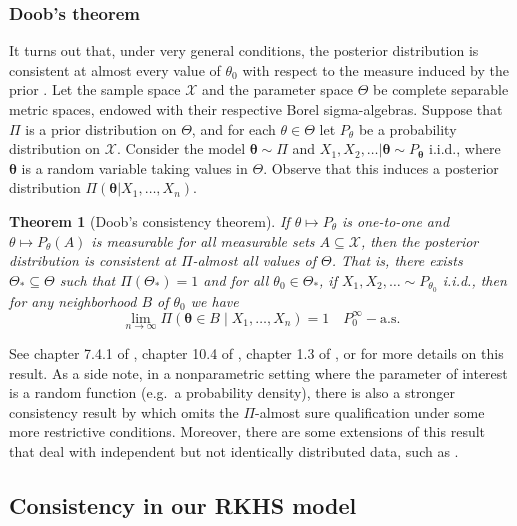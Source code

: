 \documentclass{article}
\numberwithin{equation}{section}
\theoremstyle{plain}
\newtheorem{theorem}{Theorem}[section]
\begin{document}
\subsubsection*{Doob's theorem}

It turns out that, under very general conditions, the posterior distribution is consistent at almost every value of \(\theta_0\) with respect to the measure induced by the prior \citep{doob1949application}. Let the sample space \(\mathcal X\) and the parameter space \(\Theta\) be complete separable metric spaces, endowed with their respective Borel sigma-algebras. Suppose that \(\Pi\) is a prior distribution on \(\Theta\), and for each \(\theta\in\Theta\) let \(P_\theta\) be a probability distribution on \(\mathcal X\). Consider the model \(\bm \theta \sim \Pi\) and \(X_1,X_2, \ldots | \bm \theta \sim P_{\bm \theta}\) i.i.d., where \(\bm\theta\) is a random variable taking values in \(\Theta\). Observe that this induces a posterior distribution \(\Pi(\bm\theta | X_1,\dots, X_n)\).

\begin{theorem}[Doob's consistency theorem]
  If \(\theta \mapsto P_\theta\) is one-to-one and \(\theta \mapsto P_\theta(A)\) is measurable for all measurable sets \(A\subseteq \mathcal X\), then the posterior distribution is consistent at \(\Pi\)-almost all values of \(\Theta\). That is, there exists \(\Theta_*\subseteq \Theta\) such that \(\Pi(\Theta_*)=1\) and for all \(\theta_0\in\Theta_*\), if \(X_1,X_2,\ldots \sim P_{\theta_0}\) i.i.d., then for any neighborhood \(B\) of \(\theta_0\) we have
  \[
    \lim_{n\to\infty} \Pi(\bm \theta \in B \mid X_1,\dots, X_n) = 1 \quad P_{0}^\infty-\text{a.s.}
  \]
\end{theorem}
See chapter 7.4.1 of \citet{schervish1995theory}, chapter 10.4 of \citet{van1998asymptotic}, chapter 1.3 of \citet{ghosh2003bayesian}, or \citet{miller2018detailed} for more details on this result. As a side note, in a nonparametric setting where the parameter of interest is a random function (e.g.\ a probability density), there is also a stronger consistency result by \citet{schwartz1965bayes} which omits the \(\Pi\)-almost sure qualification under some more restrictive conditions. Moreover, there are some extensions of this result that deal with independent but not identically distributed data, such as \citet{choi2008remarks}.


\subsection{Consistency in our RKHS model}
\end{document}

